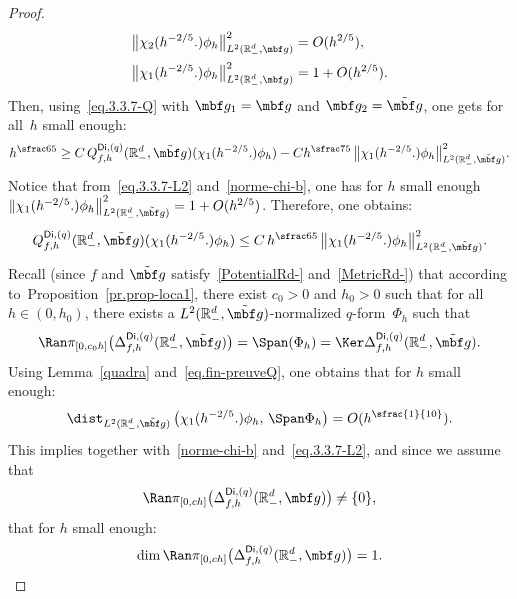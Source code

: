 \begin{proof}
\begin{equation}
\begin{aligned}
&\big\Vert \chi_2(h^{-2/5 }.) \phi_h\big \Vert_{L^2(\mathbb R^d_-,\mbf g)}^2 =O (h^{2/5 }), \\
& \big\Vert \chi_1(h^{-2/5
}.) \phi_h\big\Vert_{L^2(\mathbb R^d_-,\mbf g)}^2=1+O (h^{2/5 }).
\end{aligned}
\end{equation}
Then, using~\eqref{eq.3.3.7-Q} with $\mbf g_1=\mbf g$ and $\mbf g_2=\tilde{\mbf g}$, one gets for all~$h$ small enough:\vspace*{-3pt}
\[
h^{\sfrac 65} \ge C\, Q_{f,h}^{\mathsf{Di},(q)}(\mathbb R^d_-,\tilde{\mbf g})(\chi_1(h^{-2/5 }.)\phi_h)- Ch^{\sfrac 75}\, \big \Vert \chi_1(h^{-2/5 }.)\phi_h\big \Vert_{L^2(\mathbb R^d_-,\tilde{\mbf g})}^2.
\]
Notice that from~\eqref{eq.3.3.7-L2} and~\eqref{norme-chi-b}, one has
for $h$ small enough
$ \Vert \chi_1(h^{-2/5 }.)\phi_h\big \Vert_{L^2(\mathbb R^d_-,\tilde{\mbf g})}^2=1+O(h^{2/5 })$.
Therefore, one obtains:\vspace*{-3pt}
\begin{align}\label{eq.fin-preuveQ}
Q_{f,h}^{\mathsf{Di},(q)}(\mathbb R^d_-,\tilde{\mbf g})(\chi_1(h^{-2/5 }.)\phi_h) \le C \, h^{\sfrac 65} \, \big \Vert \chi_1(h^{-2/5 }.)\phi_h\big \Vert_{L^2(\mathbb R^d_-,\tilde{\mbf g})}^2.
\end{align}
Recall (since $f$ and $\tilde{\mbf g}$ satisfy~\ref{PotentialRd-} and~\ref{MetricRd-}) that according to~Proposition~\ref{pr.prop-loca1}, there exist $c_0>0$ and $h_0>0$ such that for all $h\in (0,h_0)$, there exists a $L^2(\mathbb R^d_-,\tilde{\mbf g})$-normalized $q$-form~$\Phi_h$ such that
\begin{equation}\label{eq.PHIH}
\Ran \pi_{[0,c_0h]}\bigl(\Delta_{f,h}^{\mathsf{Di},(q)}(\mathbb R_-^d,\tilde{\mbf g})\bigr)=\Span (\Phi_h)=\Ker \Delta_{f,h}^{\mathsf{Di},(q)}(\mathbb R_-^d,\tilde{\mbf g}).
\end{equation}
Using Lemma~\ref{quadra} and~\eqref{eq.fin-preuveQ}, one obtains that for $h$ small enough:
\begin{align*}
\dist_{L^2(\mathbb R_-^d,\tilde{\mbf g})}\, \bigl(\chi_1(h^{-2/5 }.)\phi_h,\, \Span \Phi_h \bigr)= O(h^{\sfrac{1}{10}}).
\end{align*}
This implies together with~\eqref{norme-chi-b}
and~\eqref{eq.3.3.7-L2}, and since we assume that
\[
\Ran \pi_{[0,ch]}\bigl(\Delta_{f,h}^{\mathsf{Di},(q)}(\mathbb R_-^d, \mbf g) \bigr)\neq \{0\},
\]
that for $h$ small enough:
\[
\dim \Ran \pi_{[0,ch]}\bigl(\Delta_{f,h}^{\mathsf{Di},(q)}(\mathbb R^d_-,\mbf g)\bigr)= 1.
\]


\end{proof}
